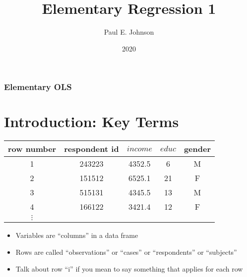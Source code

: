 \documentclass[10pt,english]{beamer}
\providecommand{\tabularnewline}{\\}
\def\lyxframeend{} %
\def\Sweavesize{\normalsize}
\def\Rcolor{\color{black}}
\def\Rbackground{\color[gray]{0.95}}
\newcommand\makebeamertitle{\frame{\maketitle}}%
\begin{document}

\def\Sweavesize{\scriptsize} 
\def\Rcolor{\color{black}} 
\def\Rbackground{\color[gray]{0.90}}




\title[Regression 1]{Elementary Regression 1}


\author{Paul E. Johnson \and {}}




\date[2020]{2020}

\makebeamertitle

\lyxframeend{}




\begin{frame}

\frametitle{Elementary OLS}

\tableofcontents{}

\end{frame}


\lyxframeend{}\section{Introduction: Key Terms}


\lyxframeend{}

\begin{center}
\begin{tabular}{|c|c|c|c|c|}
\hline 
row number &
respondent id &
$income$ &
$educ$  &
gender\tabularnewline
\hline 
\hline 
1 &
243223 &
4352.5 &
6 &
M\tabularnewline
\hline 
2 &
151512 &
6525.1 &
21 &
F\tabularnewline
\hline 
3 &
515131 &
4345.5 &
13 &
M\tabularnewline
\hline 
4 &
166122 &
3421.4 &
12 &
F\tabularnewline
\hline 
$\vdots$ &
 &
 &
 &
\tabularnewline
\hline 
\end{tabular}
\par\end{center}
\begin{itemize}
\item Variables are ``columns'' in a data frame
\item Rows are called ``observations'' or ``cases'' or ``respondents''
or ``subjects''
\item Talk about row ``i'' if you mean to say something that applies for
each row
\end{itemize}
\end{document}
